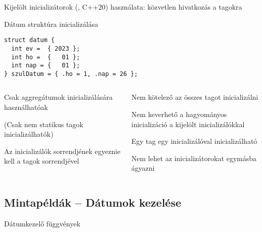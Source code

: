 \documentclass[usenames,dvipsnames,aspectratio=169]{beamer}
\begin{document}
\begin{frame}[fragile]
  Kijelölt inicializátorok (, C++20) használata: közvetlen hivatkozás a tagokra
  \begin{exampleblock}{Dátum struktúra inicializálása}
    \footnotesize
    \vspace{-.2cm}
    \begin{verbatim}
struct datum {
  int ev =  { 2023 };
  int ho =  {   01 };
  int nap = {   01 };
} szulDatum = { .ho = 1, .nap = 26 };
\end{verbatim}
    \vspace{-.2cm}
  \end{exampleblock}
  \footnotesize
  \begin{columns}[T]
      \begin{compactitem}
        \item Csak aggregátumok inicializálására használhatóak
        \item (Csak nem statikus tagok inicializálhatók)
        \item Az inicializálók sorrendjének egyeznie kell a tagok sorrendjével
      \end{compactitem}
    \begin{compactitem}
      \item Nem kötelező az összes tagot inicializálni
      \item Nem keverhető a hagyományos inicializáció a kijelölt inicializálókkal
      \item Egy tag egy inicializálóval inicializálható
      \item Nem lehet az inicializátorokat egymásba ágyazni
    \end{compactitem}
  \end{columns}
\end{frame}

\subsection{Mintapéldák -- Dátumok kezelése}
\begin{frame}
  \begin{exampleblock}{ Dátumkezelő függvények}
    \scriptsize
    \vspace{-.2cm}
    
    \vspace{-.2cm}
  \end{exampleblock}
\end{frame}
\end{document}
